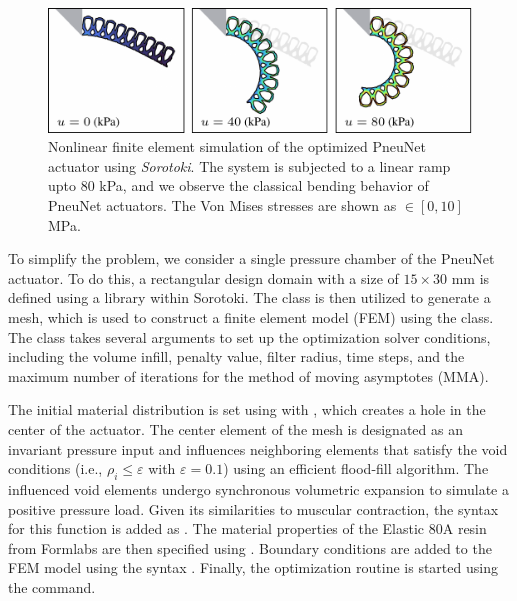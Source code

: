 \begin{figure}[!t]
    \centering
    \includegraphics*[width=.95\textwidth]{./pdf/thesis-figure-6-23.pdf}
    \caption{Nonlinear finite element simulation of the optimized PneuNet actuator using \textit{Sorotoki}. The system is subjected to a linear ramp upto 80 \si{\kilo \pascal}, and we observe the classical bending behavior of PneuNet actuators. The Von Mises stresses are shown as \protect{}$\!\!\in [0,10]$ \si{\mega \pascal}. }
    \label{fig:C5:fig_optpneunet_fem}
    \vspace{-3mm}
\end{figure}
%

To simplify the problem, we consider a single pressure chamber of the PneuNet actuator. To do this, a rectangular design domain with a size of $15 \times 30$ \si{\milli \meter} is defined using a  library within Sorotoki. The  class is then utilized to generate a mesh, which is used to construct a finite element model (FEM) using the  class. The  class takes several arguments to set up the optimization solver conditions, including the volume infill, penalty value, filter radius, time steps, and the maximum number of iterations for the method of moving asymptotes (MMA).

%
%
The initial material distribution is set using  with , which creates a hole in the center of the actuator. The center element of the mesh is designated as an invariant pressure input and influences neighboring elements that satisfy the void conditions (i.e., $\rho_i \le \varepsilon$ with $\varepsilon = 0.1$) using an efficient flood-fill algorithm. The influenced void elements undergo synchronous volumetric expansion to simulate a positive pressure load. Given its similarities to muscular contraction, the syntax for this function is added as . The material properties of the Elastic 80A resin from Formlabs are then specified using . Boundary conditions are added to the FEM model using the syntax . Finally, the optimization routine is started using the  command. %

